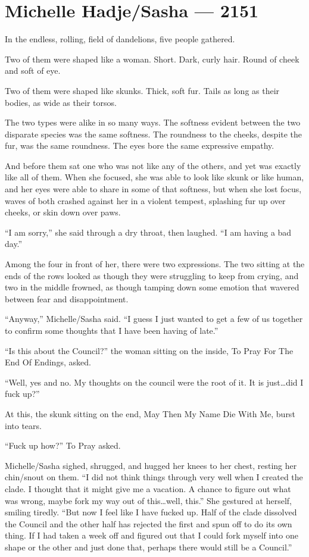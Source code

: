 \hypertarget{michelle-hadjesasha-2151}{%
\chapter{Michelle Hadje/Sasha — 2151}\label{michelle-hadjesasha-2151}}

In the endless, rolling, field of dandelions, five people gathered.

Two of them were shaped like a woman. Short. Dark, curly hair. Round of cheek and soft of eye.

Two of them were shaped like skunks. Thick, soft fur. Tails as long as their bodies, as wide as their torsos.

The two types were alike in so many ways. The softness evident between the two disparate species was the same softness. The roundness to the cheeks, despite the fur, was the same roundness. The eyes bore the same expressive empathy.

And before them sat one who was not like any of the others, and yet was exactly like all of them. When she focused, she was able to look like skunk or like human, and her eyes were able to share in some of that softness, but when she lost focus, waves of both crashed against her in a violent tempest, splashing fur up over cheeks, or skin down over paws.

``I am sorry,'' she said through a dry throat, then laughed. ``I am having a bad day.''

Among the four in front of her, there were two expressions. The two sitting at the ends of the rows looked as though they were struggling to keep from crying, and two in the middle frowned, as though tamping down some emotion that wavered between fear and disappointment.

``Anyway,'' Michelle/Sasha said. ``I guess I just wanted to get a few of us together to confirm some thoughts that I have been having of late.''

``Is this about the Council?'' the woman sitting on the inside, To Pray For The End Of Endings, asked.

``Well, yes and no. My thoughts on the council were the root of it. It is just\ldots did I fuck up?''

At this, the skunk sitting on the end, May Then My Name Die With Me, burst into tears.

``Fuck up how?'' To Pray asked.

Michelle/Sasha sighed, shrugged, and hugged her knees to her chest, resting her chin/snout on them. ``I did not think things through very well when I created the clade. I thought that it might give me a vacation. A chance to figure out what was wrong, maybe fork my way out of this\ldots well, this.'' She gestured at herself, smiling tiredly. ``But now I feel like I have fucked up. Half of the clade dissolved the Council and the other half has rejected the first and spun off to do its own thing. If I had taken a week off and figured out that I could fork myself into one shape or the other and just done that, perhaps there would still be a Council.''

